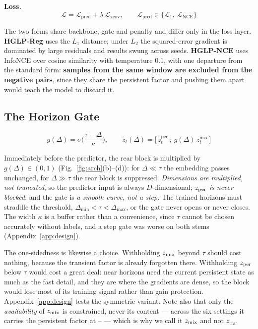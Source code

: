 \textbf{Loss.}
\begin{equation}
\mathcal{L} = \mathcal{L}_{\text{pred}} + \lambda\,\mathcal{L}_{\text{xcov}}, \qquad \mathcal{L}_{\text{pred}} \in \{\mathcal{L}_{1},\ \mathcal{L}_{\text{NCE}}\}
\label{eq:loss}
\end{equation}

The two forms share backbone, gate and penalty and differ only in the loss layer. \textbf{HGLP-Reg} uses the $L_1$ distance; under $L_2$ the squared-error gradient is dominated by large residuals and results swung across seeds. \textbf{HGLP-NCE} uses InfoNCE over cosine similarity with temperature 0.1, with one departure from the standard form: \textbf{samples from the same window are excluded from the negative pairs}, since they share the persistent factor and pushing them apart would teach the model to discard it.


\subsection{The Horizon Gate}
\label{sec:gate}

\begin{equation}
g(\Delta) = \sigma\!\Big(\frac{\tau-\Delta}{\kappa}\Big), \qquad \tilde z_t(\Delta) = \big[\,z_t^{\mathrm{per}}\,;\ g(\Delta)\,z_t^{\mathrm{mix}}\,\big]
\label{eq:gate}
\end{equation}

Immediately before the predictor, the rear block is multiplied by $g(\Delta)\in(0,1)$ (Fig.~\ref{fig:arch}(b)--(d)): for $\Delta\ll\tau$ the embedding passes unchanged, for $\Delta\gg\tau$ the rear block is suppressed. \emph{Dimensions are multiplied, not truncated}, so the predictor input is always $D$-dimensional; \emph{$z_{\mathrm{per}}$ is never blocked}; and the gate is \emph{a smooth curve, not a step}. The trained horizons must straddle the threshold, $\Delta_{\min}<\tau<\Delta_{\max}$, or the gate never opens or never closes. The width $\kappa$ is a buffer rather than a convenience, since $\tau$ cannot be chosen accurately without labels, and a step gate was worse on both stems (Appendix~\ref{app:design}).

The one-sidedness is likewise a choice. Withholding $z_{\mathrm{mix}}$ beyond $\tau$ should cost nothing, because the transient factor is already forgotten there. Withholding $z_{\mathrm{per}}$ below $\tau$ would cost a great deal: near horizons need the current persistent state as much as the fast detail, and they are where the gradients are dense, so the block would lose most of its training signal rather than gain protection. Appendix~\ref{app:design} tests the symmetric variant. Note also that only the \emph{availability} of $z_{\mathrm{mix}}$ is constrained, never its content --- across the six settings it carries the persistent factor at \numMixPerLo--\numMixPerHi{} --- which is why we call it $z_{\mathrm{mix}}$ and not $z_{\mathrm{tra}}$.

